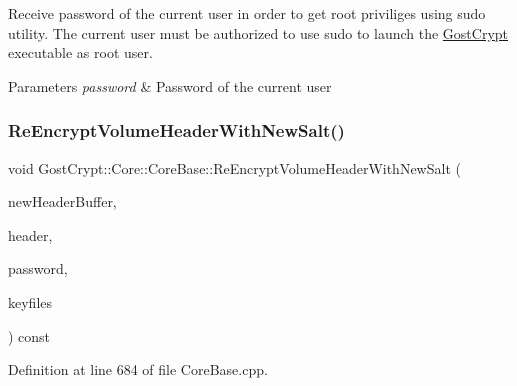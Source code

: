 Receive password of the current user in order to get root priviliges using sudo utility. The current user must be authorized to use sudo to launch the \hyperlink{namespace_gost_crypt}{Gost\+Crypt} executable as root user. 


\begin{DoxyParams}{Parameters}
{\em password} & Password of the current user \\
\hline
\end{DoxyParams}
\mbox{\label{class_gost_crypt_1_1_core_1_1_core_base_a1bbcd36f2a0eeeaf997cce7cd54cf008}} 
\subsubsection{\texorpdfstring{Re\+Encrypt\+Volume\+Header\+With\+New\+Salt()}{ReEncryptVolumeHeaderWithNewSalt()}}
{\footnotesize\ttfamily void Gost\+Crypt\+::\+Core\+::\+Core\+Base\+::\+Re\+Encrypt\+Volume\+Header\+With\+New\+Salt (\begin{DoxyParamCaption}\item[{\hyperlink{class_gost_crypt_1_1_buffer_ptr}{Buffer\+Ptr} \&}]{new\+Header\+Buffer,  }\item[{Q\+Shared\+Pointer$<$ \hyperlink{class_gost_crypt_1_1_volume_1_1_volume_header}{Volume\+::\+Volume\+Header} $>$}]{header,  }\item[{Q\+Shared\+Pointer$<$ \hyperlink{class_gost_crypt_1_1_volume_1_1_volume_password}{Volume\+::\+Volume\+Password} $>$}]{password,  }\item[{Q\+Shared\+Pointer$<$ \hyperlink{namespace_gost_crypt_1_1_volume_af2dce083ae31a8d22257d609e924963d}{Volume\+::\+Keyfile\+List} $>$}]{keyfiles }\end{DoxyParamCaption}) const\hspace{0.3cm}{\ttfamily [protected]}}



Definition at line 684 of file Core\+Base.\+cpp.

\mbox{\label{class_gost_crypt_1_1_core_1_1_core_base_a50e21a6636cfa9fc438eddc63dd9db11}} 
